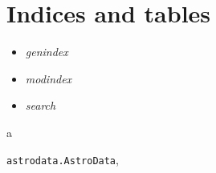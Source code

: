 \documentclass[letterpaper,10pt,english]{sphinxmanual}
\begin{document}
\chapter{Indices and tables}
\label{index:indices-and-tables}\begin{itemize}
\item {} 
\emph{genindex}

\item {} 
\emph{modindex}

\item {} 
\emph{search}

\end{itemize}


\renewcommand{\indexname}{Python Module Index}
\begin{theindex}
\def\bigletter#1{{\Large\sffamily#1}\nopagebreak\vspace{1mm}}
\bigletter{a}
\item {\texttt{astrodata.AstroData}}, \pageref{astro_class:module-astrodata.AstroData}
\end{theindex}

\renewcommand{\indexname}{Index}
\printindex
\end{document}
